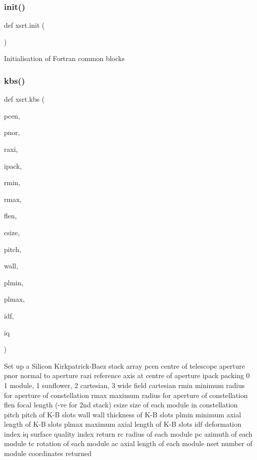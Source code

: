 \subsubsection{\texorpdfstring{init()}{init()}}
{\footnotesize\ttfamily def xsrt.\+init (\begin{DoxyParamCaption}{ }\end{DoxyParamCaption})}

\begin{DoxyVerb}Initialisation of Fortran common blocks\end{DoxyVerb}
 \mbox{\label{namespacexsrt_a8290f46ca02ebac3054ee608ea998789}} 
\subsubsection{\texorpdfstring{kbs()}{kbs()}}
{\footnotesize\ttfamily def xsrt.\+kbs (\begin{DoxyParamCaption}\item[{}]{pcen,  }\item[{}]{pnor,  }\item[{}]{raxi,  }\item[{}]{ipack,  }\item[{}]{rmin,  }\item[{}]{rmax,  }\item[{}]{flen,  }\item[{}]{csize,  }\item[{}]{pitch,  }\item[{}]{wall,  }\item[{}]{plmin,  }\item[{}]{plmax,  }\item[{}]{idf,  }\item[{}]{iq }\end{DoxyParamCaption})}

\begin{DoxyVerb}Set up a Silicon Kirkpatrick-Baez stack array
    pcen      centre of telescope aperture
    pnor      normal to aperture
    razi      reference axis at centre of aperture
    ipack     packing 0 1 module, 1 sunflower, 2 cartesian, 3 wide
              field cartesian
    rmin      minimum radius for aperture of constellation
    rmax      maximum radius for aperture of constellation
    flen      focal length (-ve for 2nd stack)
    csize     size of each module in constellation
    pitch     pitch of K-B slots
    wall      wall thickness of K-B slots
    plmin     minimum axial length of K-B slots
    plmax     maximum axial length of K-B slots
    idf       deformation index
    iq        surface quality index
return
    rc        radius of each module
    pc        azimuth of each module
    tc        rotation of each module
    ac        axial length of each module
    nset      number of module coordinates returned
\end{DoxyVerb}
 \mbox{\label{namespacexsrt_a0e13f0a134dc17c4e0c4db2f21dedef4}} 
